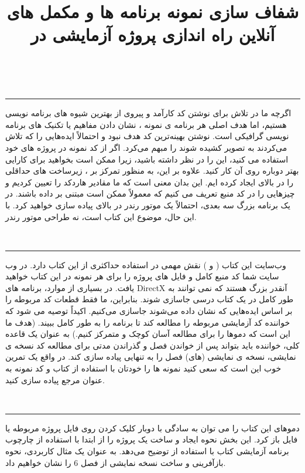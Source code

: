\title{
    \LARGE
    \textbf{شفاف سازی}
}
\\ \rule{\textwidth}{0.5pt}
{  \large
اگرچه ما در تلاش برای نوشتن کد کارآمد و پیروی از بهترین شیوه های برنامه نویسی  هستیم، اما هدف اصلی هر برنامه ی نمونه ، نشان دادن مفاهیم  یا تکنیک های برنامه نویسی گرافیکی است.
نوشتن بهینه‌ترین کد هدف نبود و احتمالاً ایده‌هایی را که تلاش می‌کردند به تصویر کشیده شوند را مبهم می‌کرد.
اگر از کد نمونه در پروژه های خود استفاده می کنید، این را در نظر داشته باشید، زیرا ممکن است بخواهید برای کارایی بهتر دوباره روی آن کار کنید.
علاوه بر این، به منظور تمرکز بر ، زیرساخت های حداقلی را در بالای  ایجاد کرده ایم. این بدان معنی است که ما مقادیر هاردکد را تعیین کردیم و چیزهایی را در کد منبع تعریف می کنیم که معمولاً ممکن است مبتنی بر داده باشند.
در یک برنامه بزرگ سه بعدی، احتمالاً یک موتور رندر در بالای  پیاده سازی خواهید کرد. با این حال، موضوع این کتاب  است، نه طراحی موتور رندر.
} \\[25pt]

\title{
    \LARGE
    \textbf{نمونه برنامه ها و مکمل های آنلاین}
}
\\ \rule{\textwidth}{0.5pt}
{  \large
وب‌سایت این کتاب ( و ) نقش مهمی در استفاده حداکثری از این کتاب دارد.
در وب سایت شما کد منبع کامل و فایل های پروژه را برای هر نمونه در این کتاب خواهید یافت.
در بسیاری از موارد، برنامه های DirectX آنقدر بزرگ هستند که نمی توانند به طور کامل در یک کتاب درسی جاسازی شوند. بنابراین، ما فقط قطعات کد مربوطه را بر اساس ایده‌هایی که نشان داده می‌شوند جاسازی می‌کنیم.
اکیداً توصیه می شود که خواننده کد آزمایشی مربوطه را مطالعه کند تا برنامه را به طور کامل ببیند. (هدف ما این است که دموها را برای مطالعه آسان کوچک و متمرکز کنیم.) به عنوان یک قاعده کلی، خواننده باید بتواند پس از خواندن فصل و گذراندن مدتی برای مطالعه کد نسخه ی نمایشی، نسخه ی نمایشی (های) فصل را به تنهایی پیاده سازی کند.
در واقع یک تمرین خوب این است که سعی کنید نمونه ها را خودتان با استفاده از کتاب و کد نمونه به عنوان مرجع پیاده سازی کنید.
} \\[25pt]

\title{
    \LARGE
    \textbf{راه اندازی پروژه آزمایشی در }
}
\\ \rule{\textwidth}{0.5pt}
{  \large
دموهای این کتاب را می توان به سادگی با دوبار کلیک کردن روی فایل پروژه مربوطه  یا فایل  باز کرد.
این بخش نحوه ایجاد و ساخت یک پروژه را از ابتدا با استفاده از چارچوب برنامه آزمایشی کتاب با استفاده از  توضیح می‌دهد.
به عنوان یک مثال کاربردی، نحوه بازآفرینی و ساخت نسخه نمایشی  از فصل 6 را نشان خواهیم داد.
} \\[25pt]


